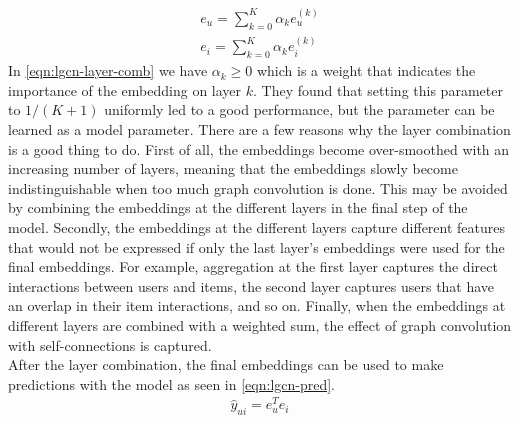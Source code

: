 \begin{align}\label{eqn:lgcn-layer-comb}
    e_{u} = \sum_{k=0}^K \alpha_k e_{u}^{(k)} \nonumber\\
    e_{i} = \sum_{k=0}^K \alpha_k e_{i}^{(k)}
\end{align}
In \autoref{eqn:lgcn-layer-comb} we have $\alpha_k \geq 0$ which is a weight that indicates the importance of the embedding on layer $k$.
They found that setting this parameter to $1/(K+1)$ uniformly led to a good performance, but the parameter can be learned as a model parameter.
There are a few reasons why the layer combination is a good thing to do.
First of all, the embeddings become over-smoothed with an increasing number of layers, meaning that the embeddings slowly become indistinguishable when too much graph convolution is done.
This may be avoided by combining the embeddings at the different layers in the final step of the model.
Secondly, the embeddings at the different layers capture different features that would not be expressed if only the last layer's embeddings were used for the final embeddings.
For example, aggregation at the first layer captures the direct interactions between users and items, the second layer captures users that have an overlap in their item interactions, and so on.
Finally, when the embeddings at different layers are combined with a weighted sum, the effect of graph convolution with self-connections is captured.
\\
After the layer combination, the final embeddings can be used to make predictions with the model as seen in \autoref{eqn:lgcn-pred}.
\begin{align}\label{eqn:lgcn-pred}
    \hat{y}_{ui} = e_{u}^T e_i
\end{align}
